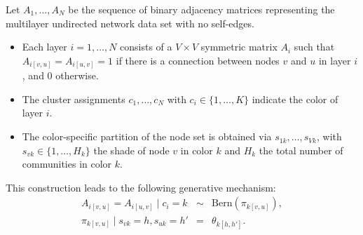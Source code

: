 \documentclass[a1,portrait,final]{a0poster}
\newenvironment{poster}{
  \begin{center}
  \begin{minipage}[c]{0.98\textwidth}
}{
  \end{minipage}
  \end{center}
}
\newcommand{\pbox}[4]{
\psshadowbox[#3]{
\begin{minipage}[t][#2][t]{#1}
#4
\end{minipage}
}}
\begin{document}
\begin{poster}
\begin{multicols}{2}
\vspace{0.5cm}

\begin{center}
  \pbox{0.8\columnwidth}{}{linewidth=1.5mm,framearc=0.1,linecolor=lightblue,fillstyle=gradient,
    gradangle=0,gradbegin=white,gradend=whiteblue,gradmidpoint=2.0,framesep=0.7em}{
    \begin{center}
      {\large \bf RASHAD Model}
    \end{center}
  }
\end{center}

\vspace{1cm}
 
Let $A_1, \ldots, A_N$ be the sequence of binary adjacency matrices representing the multilayer undirected network data set with no self-edges. 

\vspace{.2cm}

\begin{itemize}
\item Each layer $i=1, \ldots,N$ consists of a $V \times V$ symmetric matrix $A_i$ such that $A_{i[v,u]}=A_{i[u,v]}  =1$ if there is a connection between nodes $v$ and $u$ in layer $i$, and $0$ otherwise. 

\vspace{.2cm}

\item The cluster assignments $c_1,\ldots,c_N$ with $c_i \in \{1, \ldots,  K\}$ indicate the color of layer $i$. 

\vspace{.2cm}

\item The color-specific partition of the node set is obtained via $s_{1k}, \ldots, s_{Vk}$, with $s_{vk} \in  \{1, \ldots,  H_k\}$ the shade of node $v$ in color $k$ and $H_k$ the total number of communities in color $k$.
\end{itemize}

\vspace{0.5cm}

This construction leads to the following generative mechanism:
\begin{eqnarray}
A_{i[v,u]}=A_{i[u,v]} \mid c_i=k &\sim& \mbox{Bern}(\pi_{k[v,u]}),\label{eq_1} \\
\pi_{k[v,u]} \mid s_{vk}=h, s_{uk}=h'&=&\theta_{k[h,h']}.
\label{eq_2}
\end{eqnarray}




\end{multicols}
\end{poster}
\end{document}
